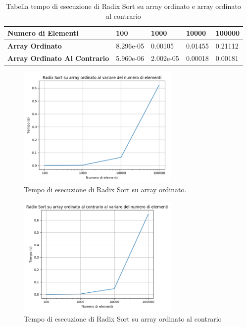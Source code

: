 \documentclass[a4paper]{article}
\begin{document}
\begin{center}
\begin{table}[h!]
\centering
\begin{tabular}{|l|l|l|l|l|}
\hline
\textbf{Numero di Elementi} & \textbf{100} & \textbf{1000} & \textbf{10000} & \textbf{100000}\\
\hline
\textbf{Array Ordinato} & 8.296e-05 & 0.00105 & 0.01455 & 0.21112\\
\hline
\textbf{Array Ordinato Al Contrario} & 5.960e-06 & 2.002e-05 & 0.00018 & 0.00181 \\
\hline
\end{tabular}
\caption{Tabella tempo di esecuzione di Radix Sort su array ordinato e array ordinato al contrario}
\end{table}
\end{center}

\begin{figure}[h]
    \centering
    \captionsetup{justification=centering,margin=1.0cm}
    \includegraphics[width=0.7\textwidth]{RS_Ordinato}
    \caption{Tempo di esecuzione di Radix Sort su array ordinato.}
    \label{fig:test2_1}
\end{figure}

\begin{figure}[h]
    \centering
    \captionsetup{justification=centering,margin=1.0cm}
    \includegraphics[width=0.7\textwidth]{RS_Ordinato_Contrario}
    \caption{Tempo di esecuzione di Radix Sort su array ordinato al contrario}
    \label{fig:test2_1}
\end{figure}
\end{document}
